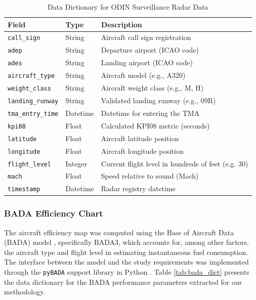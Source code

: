 \begin{table}[htbp]
\caption{Data Dictionary for ODIN Surveillance Radar Data}
\label{tab:odin_dict}
\centering
\begin{tabular}{m{} m{} m{}}
\hline
\textbf{Field} & \textbf{Type} & \textbf{Description} \\
\hline
\texttt{call\_sign} & String & Aircraft call sign registration \\
\texttt{adep} & String & Departure airport (ICAO code) \\
\texttt{ades} & String & Landing airport (ICAO code) \\
\texttt{aircraft\_type} & String & Aircraft model (e.g., A320) \\
\texttt{weight\_class} & String & Aircraft weight class (e.g., M, H) \\
\texttt{landing\_runway} & String & Validated landing runway (e.g., 09R) \\
\texttt{tma\_entry\_time} & Datetime & Datetime for entering the TMA \\
\texttt{kpi08} & Float & Calculated KPI08 metric (seconds) \\
\texttt{latitude} & Float & Aircraft latitude position \\
\texttt{longitude} & Float & Aircraft longitude position \\
\texttt{flight\_level} & Integer & Current flight level in hundreds of feet (e.g. 30) \\
\texttt{mach} & Float & Speed relative to sound (Mach) \\
\texttt{timestamp} & Datetime & Radar registry datetime \\
\hline
\end{tabular}
\end{table}

\subsubsection{BADA Efficiency Chart}
The aircraft efficiency map was computed using the Base of Aircraft Data (BADA) model \cite{bada_a320}, specifically BADA3, which accounts for, among other factors, the aircraft type and flight level in estimating instantaneous fuel consumption. The interface between the model and the study requirements was implemented through the \texttt{pyBADA} support library in Python \cite{pybada}. Table \ref{tab:bada_dict} presents the data dictionary for the BADA performance parameters extracted for our methodology.


